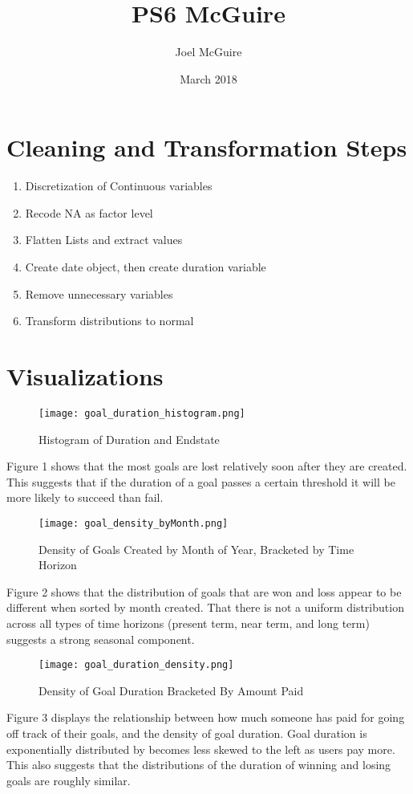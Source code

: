 \documentclass{article}
\title{PS6 McGuire}
\author{Joel McGuire}
\date{March 2018}
\begin{document}
\maketitle

\section{Cleaning and Transformation Steps}

\begin{enumerate}
    \item Discretization of Continuous variables
    \item Recode NA as factor level
    \item Flatten Lists and extract values
    \item Create date object, then create duration variable
    \item Remove unnecessary variables
    \item Transform distributions to normal
\end{enumerate}



\section{Visualizations}


\begin{figure}[h!]
\centering
\texttt{[image: goal\_duration\_histogram.png]}
\caption{Histogram of Duration and Endstate}
\end{figure}

Figure 1 shows that the most goals are lost relatively soon after they are created. This suggests that if the duration of a goal passes a certain threshold it will be more likely to succeed than fail. 


\begin{figure}[h!]
\centering
\texttt{[image: goal\_density\_byMonth.png]}
\caption{Density of Goals Created by Month of Year, Bracketed by Time Horizon}
\end{figure}

Figure 2 shows that the distribution of goals that are won and loss appear to be different when sorted by month created. That there is not a uniform distribution across all types of time horizons (present term, near term, and long term) suggests a strong seasonal component. 


\begin{figure}[h!]
\centering
\texttt{[image: goal\_duration\_density.png]}
\caption{Density of Goal Duration Bracketed By Amount Paid}
\end{figure}

Figure 3 displays the relationship between how much someone has paid for going off track of their goals, and the density of goal duration. Goal duration is exponentially distributed by becomes less skewed to the left as users pay more. This also suggests that the distributions of the duration of winning and losing goals are roughly similar.
\end{document}
